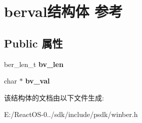 \hypertarget{structberval}{}\section{berval结构体 参考}
\label{structberval}
\subsection*{Public 属性}
\begin{DoxyCompactItemize}
\item 
\mbox{\label{structberval_accd97f65de96ee43ecab67904317c25a}} 
ber\+\_\+len\+\_\+t {\bfseries bv\+\_\+len}
\item 
\mbox{\label{structberval_a8747a959428575060f5e583afcb7c6d9}} 
char $\ast$ {\bfseries bv\+\_\+val}
\end{DoxyCompactItemize}


该结构体的文档由以下文件生成\+:\begin{DoxyCompactItemize}
\item 
E\+:/\+React\+O\+S-\/0../sdk/include/psdk/winber.\+h\end{DoxyCompactItemize}
